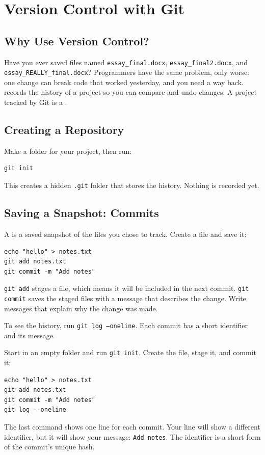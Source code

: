 \chapter{Version Control with Git}

\section{Why Use Version Control?}
Have you ever saved files named \texttt{essay\_final.docx}, \texttt{essay\_final2.docx}, and \texttt{essay\_REALLY\_final.docx}? Programmers have the same problem, only worse: one change can break code that worked yesterday, and you need a way back. 
records the history of a project so you can compare and undo changes. A project
tracked by Git is a .

\section{Creating a Repository}
Make a folder for your project, then run:

\begin{verbatim}
git init
\end{verbatim}

This creates a hidden \texttt{.git} folder that stores the history. Nothing is
recorded yet.

\section{Saving a Snapshot: Commits}
A  is a saved snapshot of the files you chose to track. Create a file
and save it:

\begin{verbatim}
echo "hello" > notes.txt
git add notes.txt
git commit -m "Add notes"
\end{verbatim}

\texttt{git add} stages a file, which means it will be included in the next
commit. \texttt{git commit} saves the staged files with a message that
describes the change. Write messages that explain why the change was made.

To see the history, run \texttt{git log --oneline}. Each commit has a short
identifier and its message.

\begin{Worked}
\begin{Problem}
Start in an empty folder and run \texttt{git init}. Create the file, stage it, and commit it:
\begin{verbatim}
echo "hello" > notes.txt
git add notes.txt
git commit -m "Add notes"
git log --oneline
\end{verbatim}
\end{Problem}
\begin{Solution}
The last command shows one line for each commit. Your line will show a different identifier, but it will show your message: \texttt{Add notes}. The identifier is a short form of the commit's unique hash.
\end{Solution}
\end{Worked}

